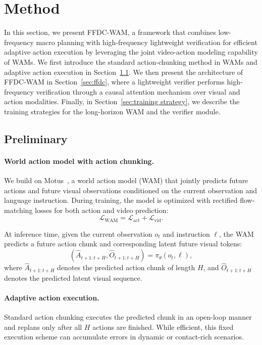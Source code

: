 \documentclass{article}
\begin{document}
\section{Method}
\label{sec:method}
In this section, we present FFDC-WAM, a framework that combines low-frequency macro planning with high-frequency lightweight verification for efficient adaptive action execution by leveraging the joint video-action modeling capability of WAMs. We first introduce the standard action-chunking method in WAMs and adaptive action execution in Section~\ref{sec:preliminary}. We then present the architecture of FFDC-WAM in Section~\ref{sec:ffdc}, where a lightweight verifier performs high-frequency verification through a causal attention mechanism over visual and action modalities. Finally, in Section~\ref{sec:training strategy}, we describe the training strategies for the long-horizon WAM and the verifier module.

\subsection{Preliminary}
\label{sec:preliminary}
\paragraph{World action model with action chunking.}

We build on Motus~\citep{bi2025motus}, a world action model (WAM) that jointly predicts future actions and future visual observations conditioned on the current observation and language instruction. During training, the model is optimized with rectified flow-matching losses for both action and video prediction:
\begin{equation}
\mathcal{L}_{\text{WAM}} = \mathcal{L}_{\text{act}} + \mathcal{L}_{\text{vid}}.
\end{equation}

At inference time, given the current observation \(o_t\) and instruction \(\ell\), the WAM predicts a future action chunk and corresponding latent future visual tokens:
\begin{equation}
\label{eq:wampred}
(\hat{A}_{t+1:t+H}, \hat{O}_{t+1:t+H}) = \pi_\theta(o_t, \ell),
\end{equation}
where \(\hat{A}_{t+1:t+H}\) denotes the predicted action chunk of length \(H\), and \(\hat{O}_{t+1:t+H}\) denotes the predicted latent visual sequence.


\paragraph{Adaptive action execution.}
Standard action chunking executes the predicted chunk in an open-loop manner and replans only after all \(H\) actions are finished. While efficient, this fixed execution scheme can accumulate errors in dynamic or contact-rich scenarios.
\end{document}
